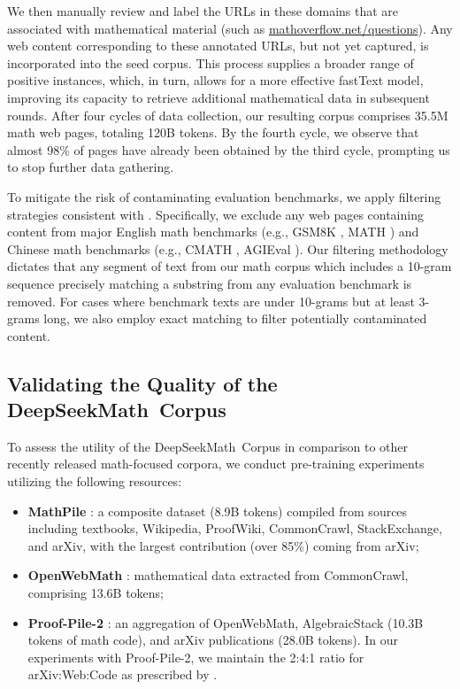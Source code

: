 We then manually review and label the URLs in these domains that are associated with mathematical material (such as \url{mathoverflow.net/questions}). Any web content corresponding to these annotated URLs, but not yet captured, is incorporated into the seed corpus. This process supplies a broader range of positive instances, which, in turn, allows for a more effective fastText model, improving its capacity to retrieve additional mathematical data in subsequent rounds. After four cycles of data collection, our resulting corpus comprises 35.5M math web pages, totaling 120B tokens. By the fourth cycle, we observe that almost 98\% of pages have already been obtained by the third cycle, prompting us to stop further data gathering.

To mitigate the risk of contaminating evaluation benchmarks, we apply filtering strategies consistent with \cite{deepseek-coder}. Specifically, we exclude any web pages containing content from major English math benchmarks (e.g., GSM8K \citep{gsm8k}, MATH \citep{MATH}) and Chinese math benchmarks (e.g., CMATH \citep{wei2023cmath}, AGIEval \citep{agieval}). Our filtering methodology dictates that any segment of text from our math corpus which includes a 10-gram sequence precisely matching a substring from any evaluation benchmark is removed. For cases where benchmark texts are under 10-grams but at least 3-grams long, we also employ exact matching to filter potentially contaminated content.

\subsection{Validating the Quality of the DeepSeekMath~Corpus}

To assess the utility of the DeepSeekMath~Corpus in comparison to other recently released math-focused corpora, we conduct pre-training experiments utilizing the following resources:

\begin{itemize}[topsep=0pt]
    \item \textbf{MathPile} \citep{mathpile}: a composite dataset (8.9B tokens) compiled from sources including textbooks, Wikipedia, ProofWiki, CommonCrawl, StackExchange, and arXiv, with the largest contribution (over 85\%) coming from arXiv;
    \item \textbf{OpenWebMath} \citep{openwebmath}: mathematical data extracted from CommonCrawl, comprising 13.6B tokens;
    \item \textbf{Proof-Pile-2} \citep{llemma}: an aggregation of OpenWebMath, AlgebraicStack (10.3B tokens of math code), and arXiv publications (28.0B tokens). In our experiments with Proof-Pile-2, we maintain the 2:4:1 ratio for arXiv:Web:Code as prescribed by \cite{llemma}.
\end{itemize}

